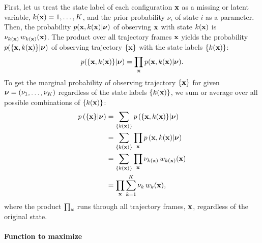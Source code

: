 \documentclass[aip,jcp,preprint,notitlepage, superscriptaddress]{revtex4-1}
\begin{document}
First,
let us treat the state label
of each configuration $\bm{\mathrm{x}}$
as a missing or latent variable,
$k(\bm{\mathrm{x}}) = 1, \dots, K$,
and the prior probability $\nu_i$ of state $i$
as a parameter.
%
Then,
the probability $p(\bm{\mathrm{x}}, k(\bm{\mathrm{x}})|\bm{\mathrm{\nu}})$
of observing
$\bm{\mathrm{x}}$ with state $k(\bm{\mathrm{x}})$ is
$\nu_{ k(\bm{\mathrm{x}}) } \, w_{ k(\bm{\mathrm{x}}) }(\bm{\mathrm{x}})$.
%
The product over all trajectory frames $\bm{\mathrm{x}}$
yields the probability
$p(\{ \bm{\mathrm{x}}, k(\bm{\mathrm{x}}) \} | \bm{\mathrm{\nu}})$
of observing trajectory $\{ \bm{\mathrm{x}} \}$
with the state labels $\{ k(\bm{\mathrm{x}}) \}$:
%
\[
  p(\{ \bm{\mathrm{x}}, k(\bm{\mathrm{x}}) \} | \bm{\mathrm{\nu}})
  =
  \prod_{\bm{\mathrm{x}}}
  p(\bm{\mathrm{x}}, k(\bm{\mathrm{x}}) | \bm{\mathrm{\nu}}).
\]
%
To get the marginal probability
of observing trajectory $\{ \bm{\mathrm{x}} \}$
for given $\bm{\mathrm{\nu}} = (\nu_1, \dots, \nu_K)$
regardless of the state labels $\{ k(\bm{\mathrm{x}}) \}$,
we sum or average over all possible combinations
of $\{ k(\bm{\mathrm{x}}) \}$:
%
\begin{align*}
  p\left( \{\bm{\mathrm{x}} \} | \bm{\mathrm{\nu}} \right)
  &=
  \sum_{ \{ k(\bm{\mathrm{x}}) \} }
  p\left(
     \{ \bm{\mathrm{x}}, k(\bm{\mathrm{x}}) \} | \bm{\mathrm{\nu}}
    \right)
  \\
  &=
  \sum_{ \{ k(\bm{\mathrm{x}}) \} }
  \prod_{ \bm{\mathrm{x}} }
  p\left(
      \bm{\mathrm{x}}, k(\bm{\mathrm{x}}) | \bm{\mathrm{\nu}}
    \right)
  \\
  &=
  \sum_{ \{ k(\bm{\mathrm{x}}) \} }
  \prod_{\bm{\mathrm{x}}}
    \nu_{ k(\bm{\mathrm{x}}) } \, w_{ k(\bm{\mathrm{x}}) }(\bm{\mathrm{x}})
  \\
  &=
  \prod_{\bm{\mathrm{x}}}
  \sum_{ k = 1 }^K
    \nu_k \, w_k(\bm{\mathrm{x}}),
\end{align*}
%
where the product $\prod_{\bm{\mathrm{x}}}$
runs through all trajectory frames, $\bm{\mathrm{x}}$,
regardless of the original state.
%




\paragraph{Function to maximize}
\end{document}
